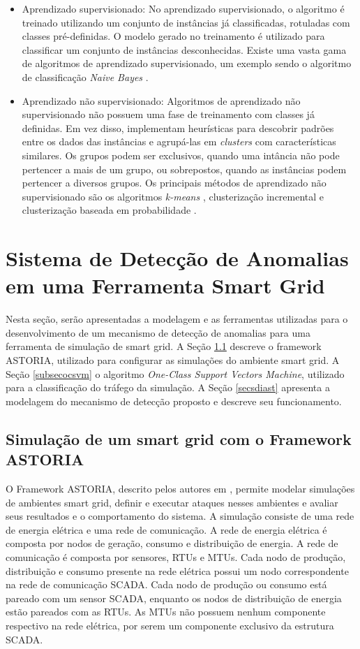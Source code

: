 \documentclass[12pt]{article}
\begin{document}
\begin{itemize}
\item{Aprendizado supervisionado}: No aprendizado supervisionado, o algoritmo é treinado utilizando um conjunto de instâncias já classificadas, rotuladas com classes pré-definidas. O modelo gerado no treinamento é utilizado para classificar um conjunto de instâncias desconhecidas. Existe uma vasta gama de algoritmos de aprendizado supervisionado, um exemplo sendo o algoritmo de classificação \emph{Naive Bayes} \cite{rish2001empirical}.
\item{Aprendizado não supervisionado}: Algoritmos de aprendizado não supervisionado não possuem uma fase de treinamento com classes já definidas. Em vez disso, implementam heurísticas para descobrir padrões entre os dados das instâncias e agrupá-las em \emph{clusters} com características similares. Os grupos podem ser exclusivos, quando uma intância não pode pertencer a mais de um grupo, ou sobrepostos, quando as instâncias podem pertencer a diversos grupos. Os principais métodos de aprendizado não supervisionado são os algoritmos \emph{k-means} \cite{wagstaff2001constrained}, clusterização incremental \cite{ester1998incremental} e clusterização baseada em probabilidade \cite{fraley2002model}.
\end{itemize} 

\section{Sistema de Detecção de Anomalias em uma Ferramenta Smart Grid}
\label{project}
Nesta seção, serão apresentadas a modelagem e as ferramentas utilizadas para o desenvolvimento de um mecanismo de detecção de anomalias para uma ferramenta de simulação de smart grid. A Seção \ref{secastoria} descreve o framework ASTORIA, utilizado para configurar as simulações do ambiente smart grid. A Seção \ref{subsecocsvm} o algoritmo \emph{One-Class Support Vectors Machine}, utilizado para a classificação do tráfego da simulação. A Seção \ref{secsdiast} apresenta a modelagem do mecanismo de detecção proposto e descreve seu funcionamento.

\subsection{Simulação de um smart grid com o Framework ASTORIA}
\label{secastoria}

O Framework ASTORIA, descrito pelos autores em \cite{wermann2015astoria}, permite modelar simulações de ambientes smart grid, definir e executar ataques nesses ambientes e avaliar seus resultados e o comportamento do sistema. A simulação consiste de uma rede de energia elétrica e uma rede de comunicação. A rede de energia elétrica é composta por nodos de geração, consumo e distribuição de energia. A rede de comunicação é composta por sensores, RTUs e MTUs. Cada nodo de produção, distribuição e consumo presente na rede elétrica possui um nodo correspondente na rede de comunicação SCADA. Cada nodo de produção ou consumo está pareado com um sensor SCADA, enquanto os nodos de distribuição de energia estão pareados com as RTUs. As MTUs não possuem nenhum componente respectivo na rede elétrica, por serem um componente exclusivo da estrutura SCADA.
\end{document}
